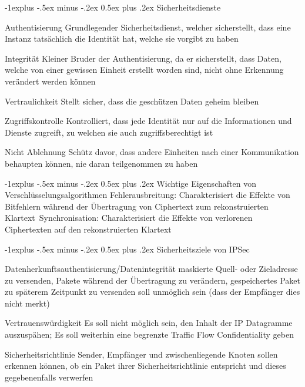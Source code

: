 \documentclass[a4paper]{article}
\makeatletter
\renewcommand{\subsection}{\@startsection{subsection}{2}{0mm}%
                                {-1explus -.5ex minus -.2ex}%
                                {0.5ex plus .2ex}%
                                {\normalfont\normalsize\bfseries}}
\makeatother
\begin{document}
\begin{multicols}{3}
    \subsection{Sicherheitsdienste}
    \begin{description*}
        \item[Authentisierung] Grundlegender Sicherheitsdienst, welcher sicherstellt, dass eine Instanz tatsächlich die Identität hat, welche sie vorgibt zu haben
        \item[Integrität] Kleiner Bruder der Authentisierung, da er sicherstellt, dass Daten, welche von einer gewissen Einheit erstellt worden sind, nicht ohne Erkennung verändert werden können
        \item[Vertraulichkeit] Stellt sicher, dass die geschützen Daten geheim bleiben
        \item[Zugriffskontrolle] Kontrolliert, dass jede Identität nur auf die Informationen und Dienste zugreift, zu welchen sie auch zugriffsberechtigt ist
        \item[Nicht Ablehnung] Schütz davor, dass andere Einheiten nach einer Kommunikation behaupten können, nie daran teilgenommen zu haben
    \end{description*}
    
    \subsection{Wichtige Eigenschaften von Verschlüsselungsalgorithmen}
    Fehlerausbreitung: Charakterisiert die Effekte von Bitfehlern während der Übertragung von Ciphertext zum rekonstruierten Klartext\
    Synchronisation: Charakterisiert die Effekte von verlorenen Ciphertexten auf den rekonstruierten Klartext
    
    \subsection{Sicherheitsziele von IPSec}
    \begin{description*}
        \item[Datenherkunftsauthentisierung/Datenintegrität] maskierte Quell- oder Zieladresse zu versenden, Pakete während der Übertragung zu verändern, gespeichertes Paket zu späterem Zeitpunkt zu versenden soll unmöglich sein (dass der Empfänger dies nicht merkt)
        \item[Vertrauenswürdigkeit] Es soll nicht möglich sein, den Inhalt der IP Datagramme auszuspähen; Es soll weiterhin eine begrenzte Traffic Flow Confidentiality geben
        \item[Sicherheitsrichtlinie] Sender, Empfänger und zwischenliegende Knoten sollen erkennen können, ob ein Paket ihrer Sicherheitsrichtlinie entspricht und dieses gegebenenfalls verwerfen
    \end{description*}
    

\end{multicols}
\end{document}
